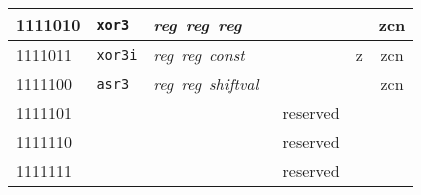 \documentclass[architecture]{compas2018}
\newcommand{\reg}{\textit{reg}}
\newcommand{\const}{\textit{const}}
\newcommand{\shiftval}{\textit{shiftval}}
\begin{document}
\begin{table}[!h]
\begin{center}
\begin{tabular}{|l|l|l|l|l|c|}
    \hline
    1111010 & \texttt{xor3}   & \reg\ \reg\ \reg\             &                                                      &      & zcn         \\
    \hline
    1111011 & \texttt{xor3i}  & \reg\ \reg\ \const\           &                                                      & {z}  & zcn         \\
    \hline
    1111100 & \texttt{asr3}   & \reg\  \reg\ \shiftval\       &                                                      &      & zcn         \\
    \hline
    1111101 & \texttt{}       &                               & reserved                                             &      &             \\
    \hline
    1111110 & \texttt{}       &                               & reserved                                             &      &             \\
    \hline
    1111111 & \texttt{}       &                               & reserved                                             &      &             \\
    \hline
  \end{tabular}
\end{center}
\end{table}
\end{document}
